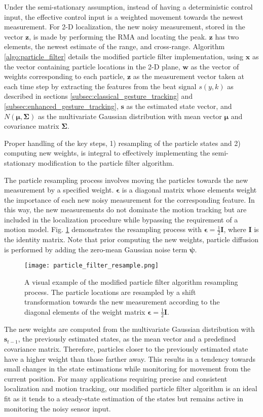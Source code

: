 \documentclass[10pt,journal,final]{IEEEtran}
\begin{document}
Under the semi-stationary assumption, instead of having a deterministic control input, the effective control input is a weighted movement towards the newest measurement. For 2-D localization, the new noisy measurement, stored in the vector $\bm{z}$, is made by performing the RMA and locating the peak. $\bm{z}$ has two elements, the newest estimate of the range, and cross-range. Algorithm \ref{algo:particle_filter} details the modified particle filter implementation, using $\bm{x}$ as the vector containing particle locations in the 2-D plane, $\bm{w}$ as the vector of weights corresponding to each particle, $\bm{z}$ as the measurement vector taken at each time step by extracting the features from the beat signal $s(y,k)$ as described in sections \ref{subsec:classical_gesture_tracking} and \ref{subsec:enhanced_gesture_tracking}, $\bm{s}$ as the estimated state vector, and $N(\bm{\mu},\bm{\Sigma})$ as the multivariate Gaussian distribution with mean vector $\bm{\mu}$ and covariance matrix $\bm{\Sigma}$.

Proper handling of the key steps, 1) resampling of the particle states and 2) computing new weights, is integral to effectively implementing the semi-stationary modification to the particle filter algorithm. 

The particle resampling process involves moving the particles towards the new measurement by a specified weight. $\bm{\epsilon}$ is a diagonal matrix whose elements weight the importance of each new noisy measurement for the corresponding feature. In this way, the new measurements do not dominate the motion tracking but are included in the localization procedure while bypassing the requirement of a motion model. Fig. \ref{fig:particle_filter} demonstrates the resampling process with $\bm{\epsilon} = \frac{1}{2}\bm{I}$, where $\bm{I}$ is the identity matrix. Note that prior computing the new weights, particle diffusion is performed by adding the zero-mean Gaussian noise term $\bm{\psi}$.

\begin{figure}[h]
	\centering
	\texttt{[image: particle\_filter\_resample.png]}
	\caption{A visual example of the modified particle filter algorithm resampling process. The particle locations are resampled by a shift transformation towards the new measurement according to the diagonal elements of the weight matrix $\bm{\epsilon} = \frac{1}{2}\bm{I}$. }
	\label{fig:particle_filter}
\end{figure}

The new weights are computed from the multivariate Gaussian distribution with $\bm{s}_{t-1}$, the previously estimated states, as the mean vector and a predefined covariance matrix. Therefore, particles closer to the previously estimated state have a higher weight than those farther away. This results in a tendency towards small changes in the state estimations while monitoring for movement from the current position. For many applications requiring precise and consistent localization and motion tracking, our modified particle filter algorithm is an ideal fit as it tends to a steady-state estimation of the states but remains active in monitoring the noisy sensor input.
\end{document}
